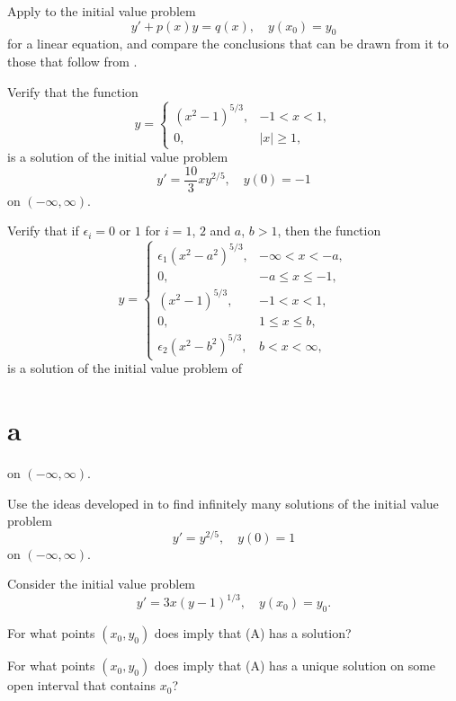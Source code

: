 \begin{exerciselist}

\item\label{exer:2.3.14}Apply  to the initial value problem
\[
y'+p(x)y = q(x), \quad y(x_0)=y_0
\]
for a linear equation, and compare the conclusions that can be drawn
from it to those that follow from .

\item\label{exer:2.3.15}\begin{alist}
\item %
Verify that the function
\[
y =
\begin{cases}
(x^2-1)^{5/3}, & -1 < x < 1, \\
0, & |x| \ge 1,
\end{cases}
\]
is a solution of the initial value problem
\[
y'=\frac{10}{3}xy^{2/5}, \quad y(0)=-1
\]
on $(-\infty,\infty)$. 

\item %
Verify that if $\epsilon_i=0$ or $1$ for $i=1$, $2$ and $a$, $b>1$, then
the function
\[
y =
\begin{cases}
\epsilon_1(x^2-a^2)^{5/3}, & - \infty < x < -a, \\
0, & -a \le x \le -1, \\
(x^2-1)^{5/3}, &  -1 < x < 1, \\
0, & 1 \le x \le b, \\
\epsilon_2(x^2-b^2)^{5/3}, & b < x < \infty,
\end{cases}
\]
is a solution of the initial value problem of \part{a} on
$(-\infty,\infty)$.
\end{alist}

\item\label{exer:2.3.16}Use the ideas developed in  to find
infinitely
many solutions  of the initial value problem
\[
y'=y^{2/5}, \quad y(0)=1
\]
on $(-\infty,\infty)$.


\item\label{exer:2.3.17}Consider the initial value
problem
\[
 y' = 3x(y-1)^{1/3}, \quad y(x_0) = y_0.\tag{A}
\]

\begin{alist}
\item %
For what points $(x_0,y_0)$ does  imply that
(A) has a solution?
\item %
 For what points $(x_0,y_0)$ does  imply that
(A) has a  unique solution on some open interval
that contains  $x_0$?
\end{alist}


\end{exerciselist}
